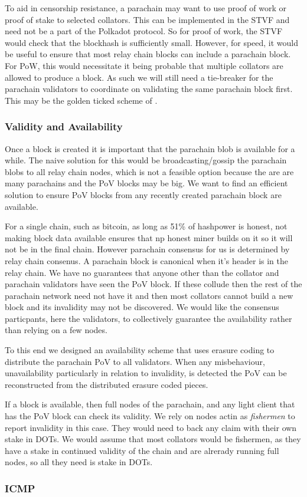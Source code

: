 To aid in censorship resistance, a parachain may want to use proof of work or proof of stake to selected collators. This can be implemented in the STVF and need not be a part of the Polkadot protocol. So for proof of work, the STVF would check that the blockhash is sufficiently small. However, for speed, it would be useful to ensure that most relay chain blocks can include a parachain block. For PoW, this would necessitate it being probable that multiple collators are allowed to produce a block. As such we will still need a tie-breaker for the parachain validators to coordinate on validating the same parachain block first. This may be the golden ticked scheme of \cite{spottypaper}.


\subsubsection{Validity and Availability} \label{sec:validity-and-availability}
Once a block is created it is important that the parachain blob is available for a while.
The naive solution for this would be broadcasting/gossip the parachain blobs to all relay chain nodes, which is not a feasible option because the are are many parachains and the PoV blocks may be big.
We want to find an efficient solution to ensure PoV blocks from any recently created parachain block are available.

For a single chain, such as bitcoin, as long as 51\% of hashpower is honest, not making block data available ensures that np honest miner builds on it so it will not be in the final chain. However parachain consensus for us is determined by relay chain consenus. A parachain block is canonical when it's header is in the relay chain. We have no guarantees that anyone other than the collator and parachain validators have seen the PoV block. If these collude then the rest of the parachain network need not have it and then most collators cannot build a new block and its invalidity may not be discovered. We would like the consensus particpants, here the validators, to collectively guarantee the availability rather than relying on a few nodes.

To this end we designed an availability scheme that uses erasure coding \cite{} to distribute the parachain PoV to all validators.
When any misbehaviour, unavailability particularly in relation to invalidity, is detected the PoV can be reconstructed from the distributed erasure coded pieces.

If a block is available, then full nodes of the parachain, and any light client that has the PoV block can check its validity. We rely on nodes actin as {\em fishermen} to report invalidity in this case. They would need to back any claim with their own stake in DOTs. We would assume that most collators would be fishermen, as they have a stake in continued validity of the chain and are alrerady running full nodes, so all they need is stake in DOTs.

\subsubsection{ICMP} \label{sec:ICMP}
